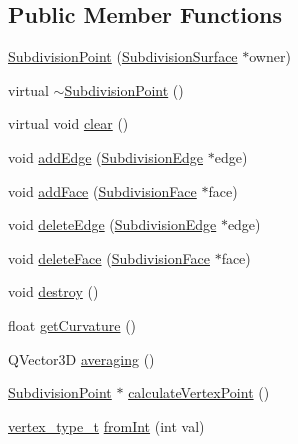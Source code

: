 \subsection*{Public Member Functions}
\begin{DoxyCompactItemize}
\item 
\hyperlink{classShipCADGeometry_1_1SubdivisionPoint_aed60af1f2fcbc89bad438a6a131a9f52}{Subdivision\-Point} (\hyperlink{classShipCADGeometry_1_1SubdivisionSurface}{Subdivision\-Surface} $\ast$owner)
\item 
virtual \hyperlink{classShipCADGeometry_1_1SubdivisionPoint_a218f451cd47873d61a4a987ec0cb3e6a}{$\sim$\-Subdivision\-Point} ()
\item 
virtual void \hyperlink{classShipCADGeometry_1_1SubdivisionPoint_aef22d2b6cb48e57ce69652eeb7a69711}{clear} ()
\item 
void \hyperlink{classShipCADGeometry_1_1SubdivisionPoint_acd07a93927bf7b6bfe9b4a3233efffdf}{add\-Edge} (\hyperlink{classShipCADGeometry_1_1SubdivisionEdge}{Subdivision\-Edge} $\ast$edge)
\item 
void \hyperlink{classShipCADGeometry_1_1SubdivisionPoint_a077ca16509feb6db73fa40a0098b72b4}{add\-Face} (\hyperlink{classShipCADGeometry_1_1SubdivisionFace}{Subdivision\-Face} $\ast$face)
\item 
void \hyperlink{classShipCADGeometry_1_1SubdivisionPoint_a5c1e66b5a28923dca99fe856ce1dff0c}{delete\-Edge} (\hyperlink{classShipCADGeometry_1_1SubdivisionEdge}{Subdivision\-Edge} $\ast$edge)
\item 
void \hyperlink{classShipCADGeometry_1_1SubdivisionPoint_a7ed94fd26e20c2e30d1f36be6b1a9b29}{delete\-Face} (\hyperlink{classShipCADGeometry_1_1SubdivisionFace}{Subdivision\-Face} $\ast$face)
\item 
void \hyperlink{classShipCADGeometry_1_1SubdivisionPoint_a63d20b811bb4af05b5f06014efd9385b}{destroy} ()
\item 
float \hyperlink{classShipCADGeometry_1_1SubdivisionPoint_aa07a859d70f97e57fc5318fc64a9d897}{get\-Curvature} ()
\item 
Q\-Vector3\-D \hyperlink{classShipCADGeometry_1_1SubdivisionPoint_a0c9e47af796dacd9542d065bbd0d0fcf}{averaging} ()
\item 
\hyperlink{classShipCADGeometry_1_1SubdivisionPoint}{Subdivision\-Point} $\ast$ \hyperlink{classShipCADGeometry_1_1SubdivisionPoint_a92632ddbe28fb6901e445b60eab8d3ee}{calculate\-Vertex\-Point} ()
\item 
\hyperlink{classShipCADGeometry_1_1SubdivisionPoint_a03df9289cd8543cd3a567fa6c8e44c43}{vertex\-\_\-type\-\_\-t} \hyperlink{classShipCADGeometry_1_1SubdivisionPoint_a42fed467d1f925a9b8b6c46599cf81f4}{from\-Int} (int val)

\end{DoxyCompactItemize}
